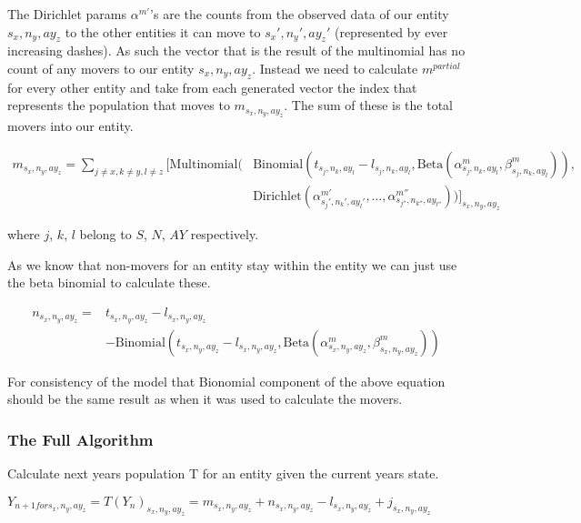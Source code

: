 \documentclass[margin=5mm]{article}
\begin{document}
The Dirichlet params $\alpha^{m'}$'s are the counts from the observed
data of our entity ${s_x,n_y,ay_z}$ to the other entities it can move
to ${s_x',n_y',ay_z'}$ (represented by ever increasing dashes).  As
such the vector that is the result of the multinomial has no count of
any movers to our entity ${s_x,n_y,ay_z}$.  Instead we need to
calculate $m^{partial}$ for every other entity and take from each
generated vector the index that represents the population that moves
to $m_{s_x,n_y,ay_z}$.  The sum of these is the total movers into our
entity.

\begin{equation*}
  \begin{split}
    m_{s_x,n_y,ay_z} = \sum_{j \neq x, k \neq y , l \neq z }\bigg[
        \text{Multinomial}( & \text{Binomial}(t_{s_j,n_k,ay_l} - l_{s_j,n_k,ay_l}, 
        \text{Beta}(\alpha^m_{s_j,n_k,ay_l},\beta^m_{s_j,n_k,ay_l})),
        \\ &  \text{Dirichlet}(\alpha^{m'}_{s_j',n_k',ay_l'}, \dots,
        \alpha^{m''}_{s_{j''},n_{k''},ay_{l''}}))\bigg]_{s_x,n_y,ay_z}
\end{split}
\end{equation*}

where $j$, $k$, $l$ belong to $S$, $N$, $AY$ respectively.

As we know that non-movers for an entity stay within the entity we can
just use the beta binomial to calculate these.

\begin{equation*}
  \begin{split}
    n_{s_x,n_y,ay_z} = & t_{s_x,n_y,ay_z}
    - l_{s_x,n_y,ay_z} \\ & - \text{Binomial}(t_{s_x,n_y,ay_z} - l_{s_x,n_y,ay_z}, 
\text{Beta}(\alpha^m_{s_x,n_y,ay_z},\beta^m_{s_x,n_y,ay_z}))
\end{split}
\end{equation*}

For consistency of the model that Bionomial component of the above
equation should be the same result as when it was used to calculate
the movers.

\subsubsection{The Full Algorithm}

Calculate next years population T for an entity given the current
years state.

$Y_{n+1 for s_x,n_y,ay_z} = T(Y_n)_{s_x,n_y,ay_z} = m_{s_x,n_y,ay_z} + n_{s_x,n_y,ay_z} -
l_{s_x,n_y,ay_z} + j_{s_x,n_y,ay_z} $
\end{document}
